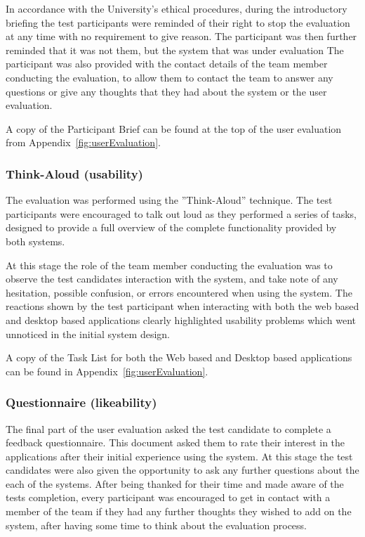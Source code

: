 In accordance with the University's ethical procedures, during the introductory
briefing the test participants were reminded of their right to stop the
evaluation at any time with no requirement to give reason. The participant was
then further reminded that it was not them, but the system that was under
evaluation The participant was also provided with the contact details of the
team member conducting the evaluation, to allow them to contact the team to
answer any questions or give any thoughts that they had about the system or the
user evaluation.

A copy of the Participant Brief can be found at the top of the user evaluation
from Appendix~\ref{fig:userEvaluation}.

\subsubsection{Think-Aloud (usability)}

The evaluation was performed using the ”Think-Aloud” technique. The test
participants were encouraged to talk out loud as they performed a series of
tasks, designed to provide a full overview of the complete functionality
provided by both systems.

At this stage the role of the team member conducting the evaluation was to
observe the test candidates interaction with the system, and take note of any
hesitation, possible confusion, or errors encountered when using the system.
The reactions shown by the test participant when interacting with both the web
based and desktop based applications clearly highlighted usability problems
which went unnoticed in the initial system design.

A copy of the Task List for both the Web based and Desktop based applications
can be found in Appendix~\ref{fig:userEvaluation}.

\subsubsection{Questionnaire (likeability)}

The final part of the user evaluation asked the test candidate to complete a
feedback questionnaire. This document asked them to rate their interest in the
applications after their initial experience using the system. At this stage the
test candidates were also given the opportunity to ask any further questions
about the each of the systems. After being thanked for their time and made
aware of the tests completion, every participant was encouraged to get in
contact with a member of the team if they had any further thoughts they wished
to add on the system, after having some time to think about the evaluation
process.

